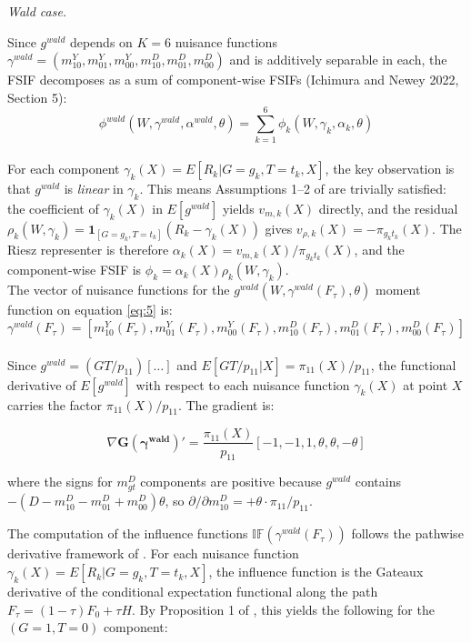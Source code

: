 \begin{propproof}
\medskip
\noindent\textit{Wald case.}

Since $g^{wald}$ depends on $K = 6$ nuisance functions $\gamma^{wald} = (m^Y_{10}, m^Y_{01}, m^Y_{00}, m^D_{10}, m^D_{01}, m^D_{00})$ and is additively separable in each, the FSIF decomposes as a sum of component-wise FSIFs (Ichimura and Newey 2022, Section 5):\\

$$ \phi^{wald}(W, \gamma^{wald}, \alpha^{wald}, \theta) = \sum_{k=1}^{6} \phi_k(W, \gamma_k, \alpha_k, \theta) $$\\

For each component $\gamma_k(X) = E[R_k | G = g_k, T = t_k, X]$, the key observation is that $g^{wald}$ is \textit{linear} in $\gamma_k$. This means Assumptions 1--2 of \cite{ichimura2022influence} are trivially satisfied: the coefficient of $\gamma_k(X)$ in $E[g^{wald}]$ yields $v_{m,k}(X)$ directly, and the residual $\rho_k(W, \gamma_k) = \mathbf{1}_{[G=g_k, T=t_k]}(R_k - \gamma_k(X))$ gives $v_{\rho,k}(X) = -\pi_{g_k t_k}(X)$. The Riesz representer is therefore $\alpha_k(X) = v_{m,k}(X) / \pi_{g_k t_k}(X)$, and the component-wise FSIF is $\phi_k = \alpha_k(X) \rho_k(W, \gamma_k)$.\\

The vector of nuisance functions for the $g^{wald}(W,\gamma^{wald}(F_{\tau}),\theta)$ moment function on equation \ref{eq:5} is:\\

$$\gamma^{wald}(F_{\tau})=[m^Y_{10}(F_{\tau}),m^Y_{01}(F_{\tau}),m^Y_{00}(F_{\tau}),m^D_{10}(F_{\tau}),m^D_{01}(F_{\tau}),m^D_{00}(F_{\tau})]$$\\

Since $g^{wald} = (GT/p_{11})[\ldots]$ and $E[GT/p_{11}|X] = \pi_{11}(X)/p_{11}$, the functional derivative of $E[g^{wald}]$ with respect to each nuisance function $\gamma_k(X)$ at point $X$ carries the factor $\pi_{11}(X)/p_{11}$. The gradient is:

$$ \nabla \mathbf{G(\gamma^{wald})}' = \frac{\pi_{11}(X)}{p_{11}}[-1,-1,1,\theta,\theta,-\theta] $$

where the signs for $m^D_{gt}$ components are positive because $g^{wald}$ contains $-(D - m^D_{10} - m^D_{01} + m^D_{00})\theta$, so $\partial/\partial m^D_{10} = +\theta \cdot \pi_{11}/p_{11}$.

The computation of the influence functions $\mathbb{IF}(\gamma^{wald}(F_{\tau}))$ follows the pathwise derivative framework of \cite{ichimura2022influence}. For each nuisance function $\gamma_k(X) = E[R_k | G=g_k, T=t_k, X]$, the influence function is the Gateaux derivative of the conditional expectation functional along the path $F_\tau = (1-\tau)F_0 + \tau H$. By Proposition 1 of \cite{ichimura2022influence}, this yields the following for the $(G=1,T=0)$ component:


\end{propproof}
